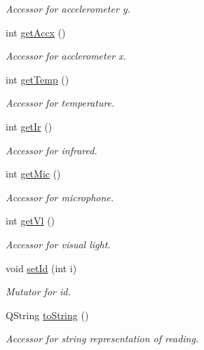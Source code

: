 \begin{DoxyCompactItemize}
\begin{DoxyCompactList}\small\item\em Accessor for accelerometer y. \item\end{DoxyCompactList}\item 
int \hyperlink{classMoteReading_ad79a65f84dfaacc9b5c179fb66a5545f}{getAccx} ()
\begin{DoxyCompactList}\small\item\em Accessor for acclerometer x. \item\end{DoxyCompactList}\item 
int \hyperlink{classMoteReading_a3f7526c29f2bf61feeb5e24298133332}{getTemp} ()
\begin{DoxyCompactList}\small\item\em Accessor for temperature. \item\end{DoxyCompactList}\item 
int \hyperlink{classMoteReading_aff0d87f9c667d01f7e37a114afa321fa}{getIr} ()
\begin{DoxyCompactList}\small\item\em Accessor for infrared. \item\end{DoxyCompactList}\item 
int \hyperlink{classMoteReading_a348cb45f4613499385a354fe6857ef5d}{getMic} ()
\begin{DoxyCompactList}\small\item\em Accessor for microphone. \item\end{DoxyCompactList}\item 
int \hyperlink{classMoteReading_a88ed6ea245c7af79e38ff8976f849f36}{getVl} ()
\begin{DoxyCompactList}\small\item\em Accessor for visual light. \item\end{DoxyCompactList}\item 
void \hyperlink{classMoteReading_a61f08f015a9f833ff7352c378b7799c2}{setId} (int i)
\begin{DoxyCompactList}\small\item\em Mutator for id. \item\end{DoxyCompactList}\item 
QString \hyperlink{classMoteReading_a5e60715c001c14f3e3f4cff6f886f0ad}{toString} ()
\begin{DoxyCompactList}\small\item\em Accessor for string representation of reading. \item\end{DoxyCompactList}\end{DoxyCompactItemize}


